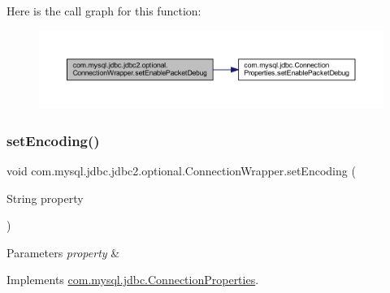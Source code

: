 Here is the call graph for this function\+:
\nopagebreak
\begin{figure}[H]
\begin{center}
\leavevmode
\includegraphics[width=350pt]{classcom_1_1mysql_1_1jdbc_1_1jdbc2_1_1optional_1_1_connection_wrapper_a8aa46e9a081e1832ae682449584a218e_cgraph}
\end{center}
\end{figure}
\mbox{\label{classcom_1_1mysql_1_1jdbc_1_1jdbc2_1_1optional_1_1_connection_wrapper_ab8560df5f3d4e0152cd9181509c1e1ae}} 
\subsubsection{\texorpdfstring{set\+Encoding()}{setEncoding()}}
{\footnotesize\ttfamily void com.\+mysql.\+jdbc.\+jdbc2.\+optional.\+Connection\+Wrapper.\+set\+Encoding (\begin{DoxyParamCaption}\item[{String}]{property }\end{DoxyParamCaption})}


\begin{DoxyParams}{Parameters}
{\em property} & \\
\hline
\end{DoxyParams}


Implements \mbox{\hyperlink{interfacecom_1_1mysql_1_1jdbc_1_1_connection_properties_a8d675a0b52e236df15eec3c77dfd8089}{com.\+mysql.\+jdbc.\+Connection\+Properties}}.

